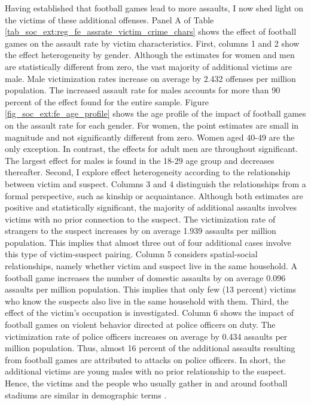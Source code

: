

Having established that football games lead to more assaults, I now shed light on the victims of these additional offenses. Panel A of Table \ref{tab_soc_ext:reg_fe_assrate_victim_crime_chars} shows the effect of football games on the assault rate by victim characteristics. First, columns 1 and 2 show the effect heterogeneity by gender. Although the estimates for women and men are statistically different from zero, the vast majority of additional victims are male. Male victimization rates increase on average by 2.432 offenses per million population. The increased assault rate for males accounts for more than 90 percent of the effect found for the entire sample. Figure \ref{fig_soc_ext:fe_age_profile} shows the age profile of the impact of football games on the assault rate for each gender. For women, the point estimates are small in magnitude and not significantly different from zero. Women aged 40-49 are the only exception. In contrast, the effects for adult men are throughout significant. The largest effect for males is found in the 18-29 age group and decreases thereafter. Second, I explore effect heterogeneity according to the relationship between victim and suspect. Columns 3 and 4 distinguish the relationships from a formal perspective, such as kinship or acquaintance. Although both estimates are positive and statistically significant, the majority of additional assaults involves victims with no prior connection to the suspect. The victimization rate of strangers to the suspect increases by on average 1.939 assaults per million population. This implies that almost three out of four additional cases involve this type of victim-suspect pairing. Column 5 considers spatial-social relationships, namely whether victim and suspect live in the same household. A football game increases the number of domestic assaults by on average 0.096 assaults per million population. This implies that only few (13 percent) victims who know the suspects also live in the same household with them. Third, the effect of the victim's occupation is investigated. Column 6 shows the impact of football games on violent behavior directed at police officers on duty. The victimization rate of police officers increases on average by 0.434 assaults per million population. Thus, almost 16 percent of the additional assaults resulting from football games are attributed to attacks on police officers. In short, the additional victims are young males with no prior relationship to the suspect. Hence, the victims and the people who usually gather in and around football stadiums are similar in demographic terms \citep{pwc2016}.


